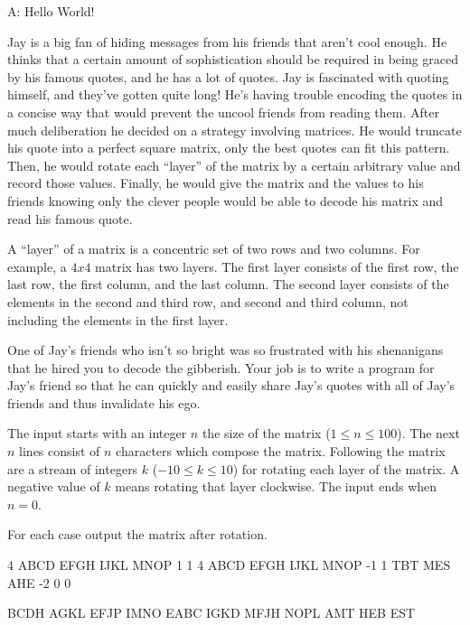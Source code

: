 \begin{problem}{A: Hello World!}

Jay is a big fan of hiding messages from his friends that aren't cool enough.
He thinks that a certain amount of sophistication should be required in being graced by his famous quotes, and he has a lot of quotes.
Jay is fascinated with quoting himself, and they've gotten quite long!
He's having trouble encoding the quotes in a concise way that would prevent the uncool friends from reading them.
After much deliberation he decided on a strategy involving matrices.
He would truncate his quote into a perfect square matrix, only the best quotes can fit this pattern.
Then, he would rotate each ``layer'' of the matrix by a certain arbitrary value and record those values.
Finally, he would give the matrix and the values to his friends knowing only the clever people would be able to decode his matrix and read his famous quote.

A ``layer'' of a matrix is a concentric set of two rows and two columns. For example, a $4x4$ matrix has two layers. The first layer consists of the first row, the last row, the first column, and the last column. The second layer consists of the elements in the second and third row, and second and third column, not including the elements in the first layer.

One of Jay's friends who isn't so bright was so frustrated with his shenanigans that he hired you to decode the gibberish.
Your job is to write a program for Jay's friend so that he can quickly and easily share Jay's quotes with all of Jay's friends and thus invalidate his ego.

\end{problem}

\begin{formalin}
The input starts with an integer $n$ the size of the matrix ($1 \leq n \leq 100$).
The next $n$ lines consist of $n$ characters which compose the matrix.
Following the matrix are a stream of integers $k$ ($-10 \leq k \leq 10$) for rotating each layer of the matrix.
A negative value of $k$ means rotating that layer clockwise.
The input ends when $n = 0$.
\end{formalin}

\begin{formalout}
For each case output the matrix after rotation.
\end{formalout}

\begin{datain}
4
ABCD
EFGH
IJKL
MNOP
1
1
4
ABCD
EFGH
IJKL
MNOP
-1
1
TBT
MES
AHE
-2
0
0
\end{datain}

\begin{dataout}
BCDH
AGKL
EFJP
IMNO
EABC
IGKD
MFJH
NOPL
AMT
HEB
EST
\end{dataout}

